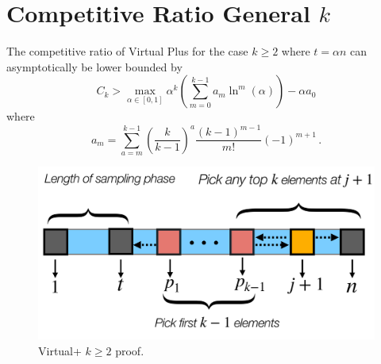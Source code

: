 \section{Competitive Ratio General $k$}
\label{app:general_k_proof}
\begin{theorem}
The competitive ratio of Virtual Plus for the case $k \geq 2$ where $t = \alpha n$ can asymptotically be lower bounded by 
\begin{equation}
    C_k >  \max_{\alpha \in [0,1]}  {\alpha}^k (\sum_{m = 0}^{k - 1} a_m \ln^m (\alpha)) - \alpha a_0
\end{equation}
    where 
\begin{equation}
    a_m = \sum_{a = m}^{k - 1} (\frac{k}{k - 1})^a \frac{(k - 1)^{m - 1}}{m!}(-1)^{m + 1}
    \, .
\end{equation}

\end{theorem}
\begin{figure}[ht]
    \centering
    \includegraphics[width=0.50\linewidth]{Figures/virtual_plus_general_k.pdf}
    \caption{Virtual+ $k \geq 2$ proof.}
    \label{fig:general_k}
\end{figure}
